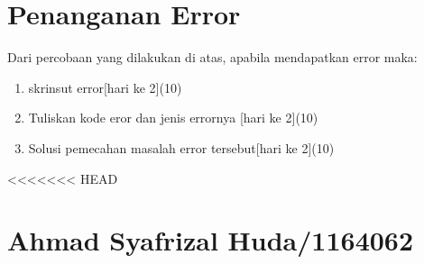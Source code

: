 \section{Penanganan Error}
Dari percobaan yang dilakukan di atas, apabila mendapatkan error maka:

\begin{enumerate}
	\item
	skrinsut error[hari ke 2](10)
	\item
Tuliskan kode eror dan jenis errornya [hari ke 2](10)
	\item
Solusi pemecahan masalah error tersebut[hari ke 2](10)

\end{enumerate}

<<<<<<< HEAD
\section{Ahmad Syafrizal Huda/1164062}
